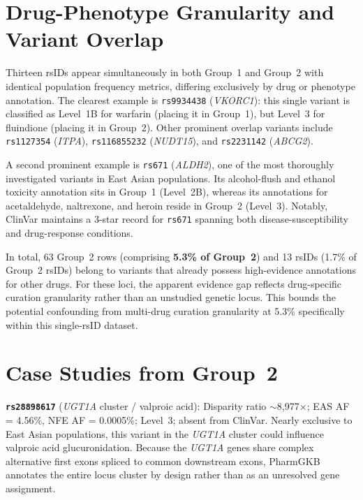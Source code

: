 \documentclass[conference]{IEEEtran}
\begin{document}
\begin{table}[!t]
\section{Drug-Phenotype Granularity and Variant Overlap}

Thirteen rsIDs appear simultaneously in both Group~1 and Group~2 with identical population frequency metrics, differing exclusively by drug or phenotype annotation.
The clearest example is \texttt{rs9934438} (\textit{VKORC1}): this single variant is classified as Level~1B for warfarin (placing it in Group~1), but Level~3 for fluindione (placing it in Group~2).
Other prominent overlap variants include \texttt{rs1127354} (\textit{ITPA}), \texttt{rs116855232} (\textit{NUDT15}), and \texttt{rs2231142} (\textit{ABCG2}).

A second prominent example is \texttt{rs671} (\textit{ALDH2}), one of the most thoroughly investigated variants in East Asian populations.
Its alcohol-flush and ethanol toxicity annotation sits in Group~1 (Level~2B), whereas its annotations for acetaldehyde, naltrexone, and heroin reside in Group~2 (Level~3).
Notably, ClinVar maintains a 3-star record for \texttt{rs671} spanning both disease-susceptibility and drug-response conditions.

In total, 63 Group~2 rows (comprising \textbf{5.3\% of Group~2}) and 13 rsIDs (1.7\% of Group~2 rsIDs) belong to variants that already possess high-evidence annotations for other drugs.
For these loci, the apparent evidence gap reflects drug-specific curation granularity rather than an unstudied genetic locus.
This bounds the potential confounding from multi-drug curation granularity at 5.3\% specifically within this single-rsID dataset.

\section{Case Studies from Group~2}

\textbf{\texttt{rs28898617}} (\textit{UGT1A} cluster / valproic acid):
Disparity ratio $\sim$8,977$\times$; EAS AF = 4.56\%, NFE AF = 0.0005\%; Level~3; absent from ClinVar.
Nearly exclusive to East Asian populations, this variant in the \textit{UGT1A} cluster could influence valproic acid glucuronidation.
Because the \textit{UGT1A} genes share complex alternative first exons spliced to common downstream exons, PharmGKB annotates the entire locus cluster by design rather than as an unresolved gene assignment.


\end{table}
\end{document}

